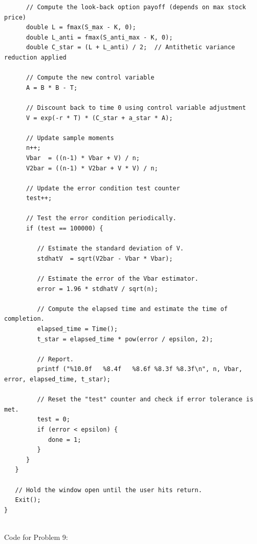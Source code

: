 \documentclass{report}
\begin{document}
\begin{lstlisting}
      // Compute the look-back option payoff (depends on max stock price)
      double L = fmax(S_max - K, 0);
      double L_anti = fmax(S_anti_max - K, 0);
      double C_star = (L + L_anti) / 2;  // Antithetic variance reduction applied

      // Compute the new control variable
      A = B * B - T;

      // Discount back to time 0 using control variable adjustment
      V = exp(-r * T) * (C_star + a_star * A);

      // Update sample moments
      n++;
      Vbar  = ((n-1) * Vbar + V) / n;
      V2bar = ((n-1) * V2bar + V * V) / n;

      // Update the error condition test counter
      test++;

      // Test the error condition periodically.
      if (test == 100000) {
         
         // Estimate the standard deviation of V.
         stdhatV  = sqrt(V2bar - Vbar * Vbar);

         // Estimate the error of the Vbar estimator.
         error = 1.96 * stdhatV / sqrt(n);
         
         // Compute the elapsed time and estimate the time of completion.
         elapsed_time = Time();
         t_star = elapsed_time * pow(error / epsilon, 2);
         
         // Report.
         printf ("%10.0f   %8.4f   %8.6f %8.3f %8.3f\n", n, Vbar, error, elapsed_time, t_star);
        
         // Reset the "test" counter and check if error tolerance is met.
         test = 0;
         if (error < epsilon) {
            done = 1;
         }
      }
   }

   // Hold the window open until the user hits return.
   Exit();
}


\end{lstlisting}

\pagebreak
Code for Problem 9:
\end{document}
